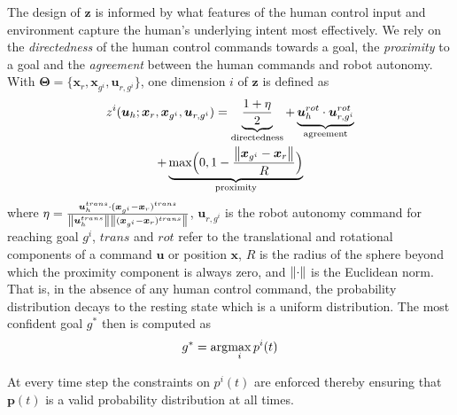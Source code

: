 The design of $\boldsymbol{z}$ is informed by what features of the human control input and environment capture the human's underlying intent most effectively. We rely on the \textit{directedness} of the human control commands towards a goal, the \textit{proximity} to a goal and the \textit{agreement} between the human commands and robot autonomy. 
With $\boldsymbol{\Theta} = \{\boldsymbol{x}_r, \boldsymbol{x}_{g^i}, \boldsymbol{u}_{r, g^i}\}$, one dimension $i$ of $\boldsymbol{z}$ is defined as 
\begin{multline}
z^i(\boldsymbol{u}_h;\boldsymbol{x}_r, \boldsymbol{x}_{g^i}, \boldsymbol{u}_{r, g^i}) = \underbrace{\frac{1 + \eta}{2}}_{\text{directedness}} + \underbrace{\boldsymbol{u}_{h}^{rot}\cdot\boldsymbol{u}_{r,g^i}^{rot}}_{\text{agreement}}
\\+ \underbrace{\text{max}\Big(0, 1-\frac{\left\lVert\boldsymbol{x}_{g^i} - \boldsymbol{x}_r\right\rVert}{R}\Big)}_{\text{proximity}}
\end{multline}
where  $\eta = \frac{\boldsymbol{u}_h^{trans}\cdot(\boldsymbol{x}_{g^i} - \boldsymbol{x}_r)^{trans}}{\left\lVert\boldsymbol{u}_h^{trans}\right\rVert\left\lVert(\boldsymbol{x}_{g^i} - \boldsymbol{x}_r)^{trans}\right\rVert}$, $\boldsymbol{u}_{r,g^i}$ is the robot autonomy command for reaching goal $g^i$, $trans$ and $rot$ refer to the translational and rotational components of a command $\boldsymbol{u}$ or position $\boldsymbol{x}$,  $R$ is the radius of the sphere beyond which the proximity component is always zero, and $\left\lVert\cdot\right\rVert$ is the Euclidean norm. That is, in the absence of any human control command, the probability distribution decays to the resting state which is a uniform distribution.  
The most confident goal $g^*$ then is computed as 
\begin{equation}
g^* = \arg\!\max_i  p^i(t)
\end{equation}

At every time step the constraints on $p^i(t)$ are enforced thereby ensuring that $\boldsymbol{p}(t)$ is a valid probability distribution at all times. 
	
